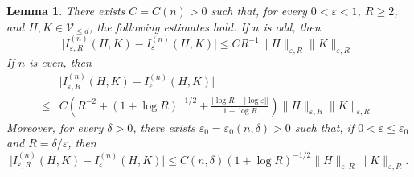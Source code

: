 \documentclass[11pt]{article}
\numberwithin{equation}{section}
\newtheorem{lemma}[theorem]{Lemma}
\theoremstyle{remark}
\begin{document}
{
\begin{lemma}\label{lem:finite-kms-bridge}
There exists \(C=C(n)>0\) such that, for every \(0<\varepsilon<1\),
\(R\ge2\), and \(H,K\in\mathcal V_{\le d}\), the following estimates
hold.  If \(n\) is odd, then
\[
 \big|I_{\varepsilon,R}^{(n)}(H,K)-I_\varepsilon^{(n)}(H,K)\big|
 \le CR^{-1}\|H\|_{\varepsilon,R}\|K\|_{\varepsilon,R}.
\]
If \(n\) is even, then
\[
\begin{aligned}
 &\big|I_{\varepsilon,R}^{(n)}(H,K)-I_\varepsilon^{(n)}(H,K)\big|\\
 {}\le{}&C\left(
 R^{-2}+(1+\log R)^{-1/2}
 +\frac{|\log R-|\log\varepsilon||}{1+\log R}\right)
 \|H\|_{\varepsilon,R}\|K\|_{\varepsilon,R}.
\end{aligned}
\]
Moreover, for every \(\delta>0\), there exists
\(\varepsilon_0=\varepsilon_0(n,\delta)>0\) such that, if
\(0<\varepsilon\le\varepsilon_0\) and \(R=\delta/\varepsilon\), then
\[
 \big|I_{\varepsilon,R}^{(n)}(H,K)-I_\varepsilon^{(n)}(H,K)\big|
 \le C(n,\delta)(1+\log R)^{-1/2}
 \|H\|_{\varepsilon,R}\|K\|_{\varepsilon,R}.
\]
\end{lemma}
}
\end{document}
